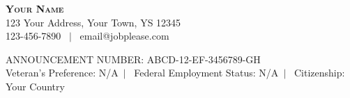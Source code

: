 \documentclass[letterpaper,12pt]{fed-res} %
\begin{document}
\begin{center}
    \textbf{\Huge \scshape Your Name} \\ \vspace{1pt}
    123 Your Address, Your Town, YS 12345 \\ \vspace{1pt}
     123-456-7890 \ $|$ \ email@jobplease.com \\ \vspace{1pt} %
\end{center}

ANNOUNCEMENT NUMBER: ABCD-12-EF-3456789-GH \\ \vspace{1pt} %
Veteran's Preference: N/A\ $|$ \ Federal Employment Status: N/A\ $|$ \ Citizenship: Your Country %









\end{document}
